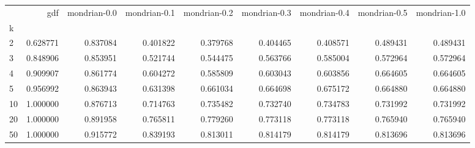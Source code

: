 \begin{tabular}{lrrrrrrrr}
\toprule
{} &       gdf &  mondrian-0.0 &  mondrian-0.1 &  mondrian-0.2 &  mondrian-0.3 &  mondrian-0.4 &  mondrian-0.5 &  mondrian-1.0 \\
k  &           &               &               &               &               &               &               &               \\
\midrule
2  &  0.628771 &      0.837084 &      0.401822 &      0.379768 &      0.404465 &      0.408571 &      0.489431 &      0.489431 \\
3  &  0.848906 &      0.853951 &      0.521744 &      0.544475 &      0.563766 &      0.585004 &      0.572964 &      0.572964 \\
4  &  0.909907 &      0.861774 &      0.604272 &      0.585809 &      0.603043 &      0.603856 &      0.664605 &      0.664605 \\
5  &  0.956992 &      0.863943 &      0.631398 &      0.661034 &      0.664698 &      0.675172 &      0.664880 &      0.664880 \\
10 &  1.000000 &      0.876713 &      0.714763 &      0.735482 &      0.732740 &      0.734783 &      0.731992 &      0.731992 \\
20 &  1.000000 &      0.891958 &      0.765811 &      0.779260 &      0.773118 &      0.773118 &      0.765940 &      0.765940 \\
50 &  1.000000 &      0.915772 &      0.839193 &      0.813011 &      0.814179 &      0.814179 &      0.813696 &      0.813696 \\
\bottomrule
\end{tabular}
